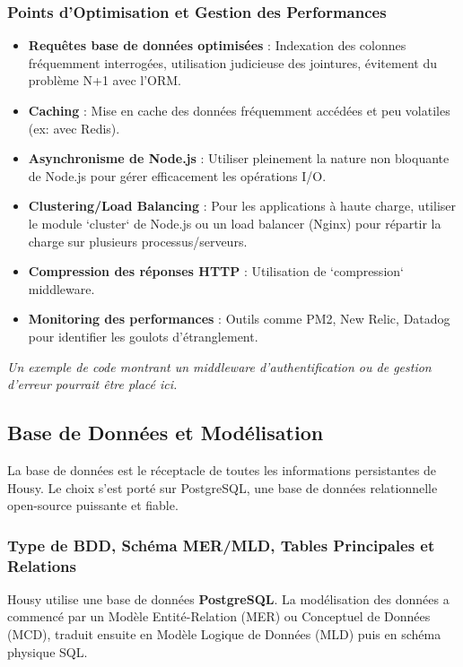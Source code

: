 \documentclass[11pt,a4paper]{report}
\begin{document}
\subsubsection{Points d’Optimisation et Gestion des Performances}
\begin{itemize}[label=\textcolor{HousyGreen}{\textbullet}]
    \item \textbf{Requêtes base de données optimisées} : Indexation des colonnes fréquemment interrogées, utilisation judicieuse des jointures, évitement du problème N+1 avec l'ORM.
    \item \textbf{Caching} : Mise en cache des données fréquemment accédées et peu volatiles (ex: avec Redis).
    \item \textbf{Asynchronisme de Node.js} : Utiliser pleinement la nature non bloquante de Node.js pour gérer efficacement les opérations I/O.
    \item \textbf{Clustering/Load Balancing} : Pour les applications à haute charge, utiliser le module `cluster` de Node.js ou un load balancer (Nginx) pour répartir la charge sur plusieurs processus/serveurs.
    \item \textbf{Compression des réponses HTTP} : Utilisation de `compression` middleware.
    \item \textbf{Monitoring des performances} : Outils comme PM2, New Relic, Datadog pour identifier les goulots d'étranglement.
\end{itemize}
\textit{Un exemple de code montrant un middleware d'authentification ou de gestion d'erreur pourrait être placé ici.}

\subsection{Base de Données et Modélisation}
\label{ssec:bdd_modelisation}
La base de données est le réceptacle de toutes les informations persistantes de Housy. Le choix s'est porté sur PostgreSQL, une base de données relationnelle open-source puissante et fiable.

\subsubsection{Type de BDD, Schéma MER/MLD, Tables Principales et Relations}
Housy utilise une base de données \textbf{PostgreSQL}. La modélisation des données a commencé par un Modèle Entité-Relation (MER) ou Conceptuel de Données (MCD), traduit ensuite en Modèle Logique de Données (MLD) puis en schéma physique SQL.
\end{document}
